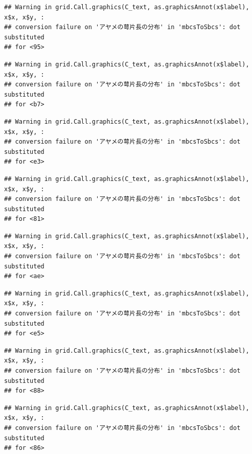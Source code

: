 \documentclass[
]{book}
\begin{document}
\begin{verbatim}
## Warning in grid.Call.graphics(C_text, as.graphicsAnnot(x$label), x$x, x$y, :
## conversion failure on 'アヤメの萼片長の分布' in 'mbcsToSbcs': dot substituted
## for <95>
\end{verbatim}

\begin{verbatim}
## Warning in grid.Call.graphics(C_text, as.graphicsAnnot(x$label), x$x, x$y, :
## conversion failure on 'アヤメの萼片長の分布' in 'mbcsToSbcs': dot substituted
## for <b7>
\end{verbatim}

\begin{verbatim}
## Warning in grid.Call.graphics(C_text, as.graphicsAnnot(x$label), x$x, x$y, :
## conversion failure on 'アヤメの萼片長の分布' in 'mbcsToSbcs': dot substituted
## for <e3>
\end{verbatim}

\begin{verbatim}
## Warning in grid.Call.graphics(C_text, as.graphicsAnnot(x$label), x$x, x$y, :
## conversion failure on 'アヤメの萼片長の分布' in 'mbcsToSbcs': dot substituted
## for <81>
\end{verbatim}

\begin{verbatim}
## Warning in grid.Call.graphics(C_text, as.graphicsAnnot(x$label), x$x, x$y, :
## conversion failure on 'アヤメの萼片長の分布' in 'mbcsToSbcs': dot substituted
## for <ae>
\end{verbatim}

\begin{verbatim}
## Warning in grid.Call.graphics(C_text, as.graphicsAnnot(x$label), x$x, x$y, :
## conversion failure on 'アヤメの萼片長の分布' in 'mbcsToSbcs': dot substituted
## for <e5>
\end{verbatim}

\begin{verbatim}
## Warning in grid.Call.graphics(C_text, as.graphicsAnnot(x$label), x$x, x$y, :
## conversion failure on 'アヤメの萼片長の分布' in 'mbcsToSbcs': dot substituted
## for <88>
\end{verbatim}

\begin{verbatim}
## Warning in grid.Call.graphics(C_text, as.graphicsAnnot(x$label), x$x, x$y, :
## conversion failure on 'アヤメの萼片長の分布' in 'mbcsToSbcs': dot substituted
## for <86>
\end{verbatim}
\end{document}
